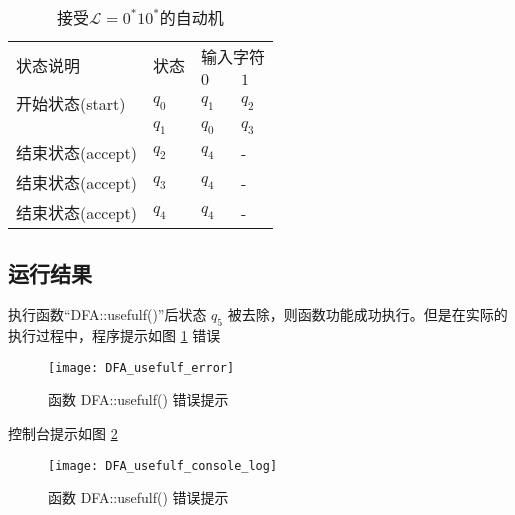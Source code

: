 \begin{table}[!htbp]
    \caption{接受{$\mathcal{L}=0^*10^*$}的自动机{\cite{book1}}}
    \label{tab:DFA4_1}
    \centering
    \small%
    \setlength{\tabcolsep}{4pt}%
    \renewcommand{\arraystretch}{1.2}%
        \begin{tabular}{l p{3em}<{\centering} p{3em}<{\centering} p{3em}<{\centering}}
        \toprule %
        \multirow{2}{*}{状态说明} & \multirow{2}{*}{状态} & \multicolumn{2}{c}{输入字符} \\
		\cline{3-4}      &    &$0$ & $1$  \\
        \midrule%
        开始状态(start)  & $q_0$ & $q_1$   & $q_2$   \\
                        & $q_1$ & $q_0$   & $q_3$   \\
        结束状态(accept) & $q_2$ & $q_4$   & -   \\
        结束状态(accept) & $q_3$ & $q_4$   & -   \\
        结束状态(accept) & $q_4$ & $q_4$   & -   \\
        \bottomrule%
    \end{tabular}
\end{table}

\subsection{运行结果}

执行函数“DFA::usefulf()”后状态 $q_5$ 被去除，则函数功能成功执行。但是在实际的执行过程中，程序提示如图 \ref{fig::usefulf_error} 错误 

\begin{figure}[!htbp]
    \centering
    \texttt{[image: DFA\_usefulf\_error]}
    \caption{函数 DFA::usefulf() 错误提示}
    \label{fig::usefulf_error}
\end{figure}
控制台提示如图 \ref{fig::usefulf_console_log}
\begin{figure}[!htbp]
    \centering
    \texttt{[image: DFA\_usefulf\_console\_log]}
    \caption{函数 DFA::usefulf() 错误提示}
    \label{fig::usefulf_console_log}
\end{figure}

